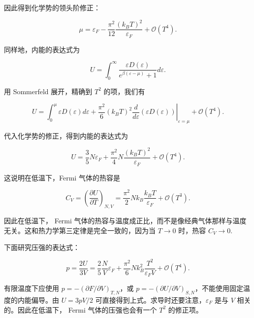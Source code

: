 因此得到化学势的领头阶修正：
\begin{linenomath}\begin{equation}
    \mu = \varepsilon_F - \frac{\pi^2}{12} \frac{(k_B T)^2}{\varepsilon_F} + \mathcal{O}(T^4).
\end{equation}\end{linenomath}
同样地，内能的表达式为
\begin{linenomath}\begin{equation}
    U = \int_{0}^{\infty} \frac{\varepsilon D(\varepsilon)}{e^{\beta(\varepsilon - \mu)} + 1} d\varepsilon.
\end{equation}\end{linenomath}
用 Sommerfeld 展开，精确到 $T^2$ 的项，我们有
\begin{linenomath}\begin{equation}
    U = \int_{0}^{\mu} \varepsilon D(\varepsilon) d\varepsilon + \frac{\pi^2}{6}(k_B T)^2 \left. \frac{d}{d\varepsilon} \left( \varepsilon D(\varepsilon) \right) \right|_{\varepsilon = \mu} + \mathcal{O}(T^4).
\end{equation}\end{linenomath}
代入化学势的修正，得到内能的表达式为
\begin{linenomath}\begin{equation}
    U = \frac{3}{5}N\varepsilon_F + \frac{\pi^2}{4} N \frac{(k_B T)^2}{\varepsilon_F} + \mathcal{O}(T^4).
\end{equation}\end{linenomath}
这说明在低温下，Fermi 气体的热容是
\begin{linenomath}\begin{equation}
    C_V = \left( \frac{\partial U}{\partial T} \right)_{N,V} = \frac{\pi^2}{2} N k_B \frac{k_B T}{\varepsilon_F} + \mathcal{O}(T^3).
\end{equation}\end{linenomath}
因此在低温下， Fermi 气体的热容与温度成正比，而不是像经典气体那样与温度无关。这和热力学第三定律是完全一致的，因为当 $T\to 0$ 时，热容 $C_V \to 0.$

下面研究压强的表达式：
\begin{linenomath}\begin{equation}
    p = \frac{2U}{3V} = \frac{2}{5}\frac{N}{V}\varepsilon_F + \frac{\pi^2}{6} N k_B^2 \frac{T^2}{\varepsilon_F V} + \mathcal{O}(T^4).
\end{equation}\end{linenomath}
有限温度下应使用 $p=-(\partial F/\partial V)_{T,N}$，或 $p=-(\partial U/\partial V)_{S,N}$，不能使用固定温度的内能偏导。由 $U=3pV/2$ 可直接得到上式。求导时还要注意，$\varepsilon_F$ 是与 $V$ 相关的。因此在低温下， Fermi 气体的压强也会有一个 $T^2$ 的修正项。

